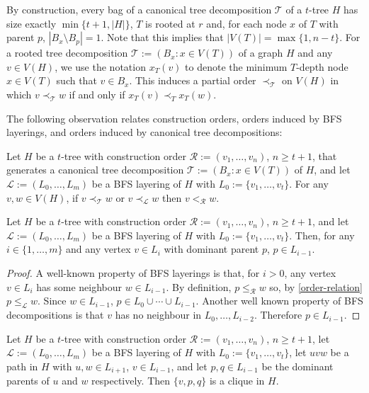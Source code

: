 \documentclass[kpfonts]{patmorin}
\theoremstyle{named}
\begin{document}
By construction, every bag of a canonical tree decomposition $\mathcal{T}$ of a $t$-tree $H$ has size exactly $\min\{t+1,|H|\}$, $T$ is rooted at $r$ and, for each node $x$ of $T$ with parent $p$, $|B_x\setminus B_p|=1$.  Note that this implies that $|V(T)|=\max\{1,n-t\}$.
For a rooted tree decomposition $\mathcal{T}:=(B_x:x\in V(T))$ of a graph $H$ and any $v\in V(H)$, we use the notation $x_T(v)$ to denote the minimum $T$-depth node $x\in V(T)$ such that $v\in B_x$.  This induces a partial order $\prec_{\mathcal{T}}$ on $V(H)$ in which $v\prec_{\mathcal{T}} w$ if and only if $x_T(v)\prec_T x_T(w)$.

The following observation relates construction orders, orders induced by BFS layerings, and orders induced by canonical tree decompositions:

\begin{obs}\label{order-relation}
    Let $H$ be a $t$-tree with construction order $\mathcal{R}:=(v_1,\ldots,v_n)$, $n\ge t+1$, that generates a canonical tree decomposition $\mathcal{T}:=(B_x:x\in V(T))$ of $H$, and let $\mathcal{L}:=(L_0,\ldots,L_m)$ be a BFS layering of $H$ with $L_0:=\{v_1,\ldots,v_t\}$.  For any $v,w\in V(H)$,
    if $v\prec_{\mathcal{T}} w$ or $v\prec_{\mathcal{L}} w$ then $v<_{\mathcal{R}} w$.
\end{obs}

\begin{obs}\label{dominant-parent}
    Let $H$ be a $t$-tree with construction order $\mathcal{R}:=(v_1,\ldots,v_n)$, $n\ge t+1$, and let $\mathcal{L}:=(L_0,\ldots,L_m)$ be a BFS layering of $H$ with $L_0:=\{v_1,\ldots,v_{t}\}$.  Then, for any $i\in\{1,\ldots,m\}$ and any vertex $v\in L_{i}$ with dominant parent $p$, $p\in L_{i-1}$.
\end{obs}

\begin{proof}
    A well-known property of BFS layerings is that, for $i>0$, any vertex $v\in L_{i}$ has some neighbour $w\in L_{i-1}$.  By definition, $p\le_\mathcal{R} w$ so, by \cref{order-relation} $p\le_\mathcal{L} w$. Since $w\in L_{i-1}$, $p\in L_0\cup\cdots\cup L_{i-1}$.  Another well known property of BFS decompositions is that $v$ has no neighbour in $L_0,\ldots,L_{i-2}$.  Therefore $p\in L_{i-1}$.
\end{proof}


\begin{obs}\label{up-clique}
    Let $H$ be a $t$-tree with construction order $\mathcal{R}:=(v_1,\ldots,v_n)$, $n\ge t+1$, let $\mathcal{L}:=(L_0,\ldots,L_m)$ be a BFS layering of $H$ with $L_0:=\{v_1,\ldots,v_{t}\}$, let $uvw$ be a path in $H$ with $u,w\in L_{i+1}$, $v\in L_{i-1}$, and let $p,q\in L_{i-1}$ be the dominant parents of $u$ and $w$ respectively.  Then $\{v,p,q\}$ is a clique in $H$.
\end{obs}
\end{document}
